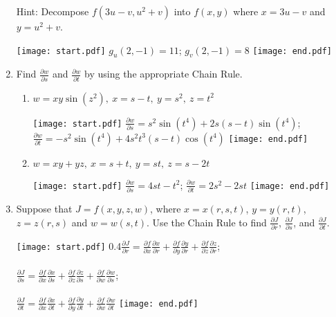 \documentclass[12pt]{article}
\begin{document}
\begin{enumerate}
Hint: Decompose $f(3u-v,u^2+v)$ into $f(x,y)$ where $x=3u-v$ and $y=u^2+v$.

\texttt{[image: start.pdf]}
{{$g_u(2,-1)=11$; $g_v(2,-1)=8$}}
\texttt{[image: end.pdf]}


\item Find $\frac{\partial w}{\partial s}$ and $\frac{\partial w}{\partial t}$ by using the appropriate Chain Rule. 

\begin{enumerate}

\item $w=xy\sin{\left(z^2\right)},\ x=s-t,\ y=s^2,\ z=t^2$ 

\texttt{[image: start.pdf]}
{{$\frac{\partial w}{\partial s}=s^2\sin{\left(t^4\right)}+2s(s-t)\sin{\left(t^4\right)}$; $\frac{\partial w}{\partial t}=-s^2\sin{\left(t^4\right)}+4s^2t^3(s-t)\cos{\left(t^4\right)}$}}
\texttt{[image: end.pdf]}


\item $w=xy+yz,\ x=s+t,\ y=st,\ z=s-2t$ 

\texttt{[image: start.pdf]}
{{$\frac{\partial w}{\partial s}=4st-t^2$; $\frac{\partial w}{\partial t}=2s^2-2st$}}
\texttt{[image: end.pdf]}


\end{enumerate}

\item Suppose that $J=f(x,y,z,w)$, where $x=x(r,s,t)$, $y=y(r,t)$, $z=z(r,s)$ and $w=w(s,t)$.  Use the Chain Rule to find $\frac{\partial J}{\partial r}$, $\frac{\partial J}{\partial s}$, and $\frac{\partial J}{\partial t}$.

\texttt{[image: start.pdf]}
{{{0.4\linewidth}{$\frac{\partial J}{\partial r}=\frac{\partial f}{\partial x}\frac{\partial x}{\partial r}+\frac{\partial f}{\partial y}\frac{\partial y}{\partial r}+\frac{\partial f}{\partial z}\frac{\partial z}{\partial r}$; \\
\\
$\frac{\partial J}{\partial s}=\frac{\partial f}{\partial x}\frac{\partial x}{\partial s}+\frac{\partial f}{\partial z}\frac{\partial z}{\partial s}+\frac{\partial f}{\partial w}\frac{\partial w}{\partial s}$;\\
\\
$\frac{\partial J}{\partial t}=\frac{\partial f}{\partial x}\frac{\partial x}{\partial t}+\frac{\partial f}{\partial y}\frac{\partial y}{\partial t}+\frac{\partial f}{\partial w}\frac{\partial w}{\partial t}$
}}}
\texttt{[image: end.pdf]}



\end{enumerate}
\end{document}
